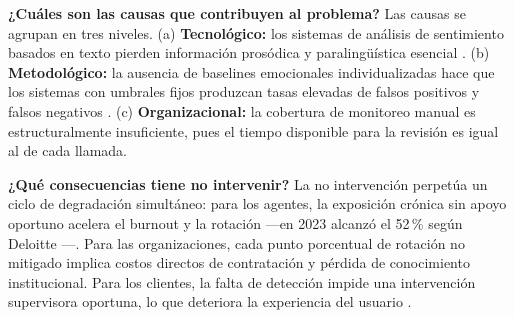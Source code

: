 \textbf{¿Cuáles son las causas que contribuyen al problema?} Las causas se agrupan en
tres niveles. (a) \textbf{Tecnológico:} los sistemas de análisis de sentimiento
basados en texto pierden información prosódica y paralingüística esencial
\cite{feng2023, jha2022}. (b) \textbf{Metodológico:} la ausencia de baselines
emocionales individualizadas hace que los sistemas con umbrales fijos produzcan tasas
elevadas de falsos positivos y falsos negativos \cite{gat2022}. (c)
\textbf{Organizacional:} la cobertura de monitoreo manual es estructuralmente
insuficiente, pues el tiempo disponible para la revisión es igual al de cada llamada.

\textbf{¿Qué consecuencias tiene no intervenir?} La no intervención perpetúa un ciclo
de degradación simultáneo: para los agentes, la exposición crónica sin apoyo oportuno
acelera el burnout y la rotación —en 2023 alcanzó el 52\,\% según Deloitte
\cite{hiringbranch2024}—. Para las organizaciones, cada punto porcentual de rotación
no mitigado implica costos directos de contratación y pérdida de conocimiento
institucional. Para los clientes, la falta de detección impide una intervención
supervisora oportuna, lo que deteriora la experiencia del usuario \cite{zoom2025}.
